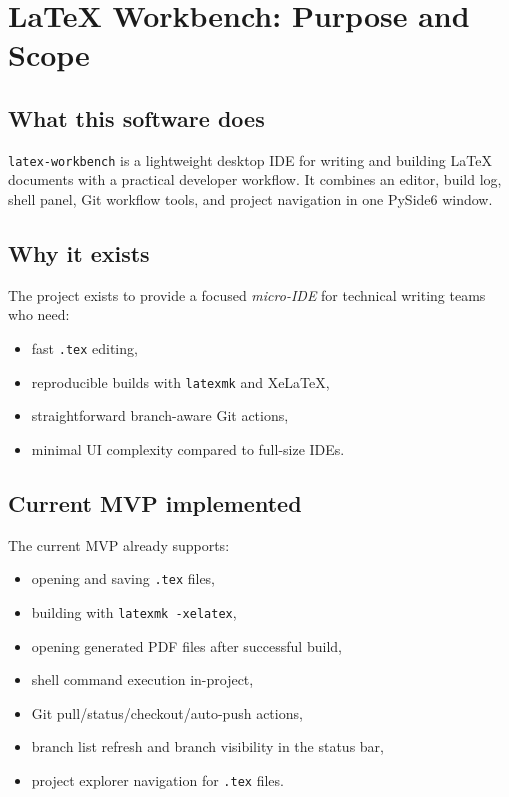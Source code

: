\chapter{LaTeX Workbench: Purpose and Scope}
\minitoc

\section{What this software does}
\texttt{latex-workbench} is a lightweight desktop IDE for writing and building LaTeX documents with a practical developer workflow. It combines an editor, build log, shell panel, Git workflow tools, and project navigation in one PySide6 window.

\section{Why it exists}
The project exists to provide a focused \emph{micro-IDE} for technical writing teams who need:
\begin{itemize}
  \item fast \texttt{.tex} editing,
  \item reproducible builds with \texttt{latexmk} and XeLaTeX,
  \item straightforward branch-aware Git actions,
  \item minimal UI complexity compared to full-size IDEs.
\end{itemize}

\section{Current MVP implemented}
The current MVP already supports:
\begin{itemize}
  \item opening and saving \texttt{.tex} files,
  \item building with \texttt{latexmk -xelatex},
  \item opening generated PDF files after successful build,
  \item shell command execution in-project,
  \item Git pull/status/checkout/auto-push actions,
  \item branch list refresh and branch visibility in the status bar,
  \item project explorer navigation for \texttt{.tex} files.
\end{itemize}
